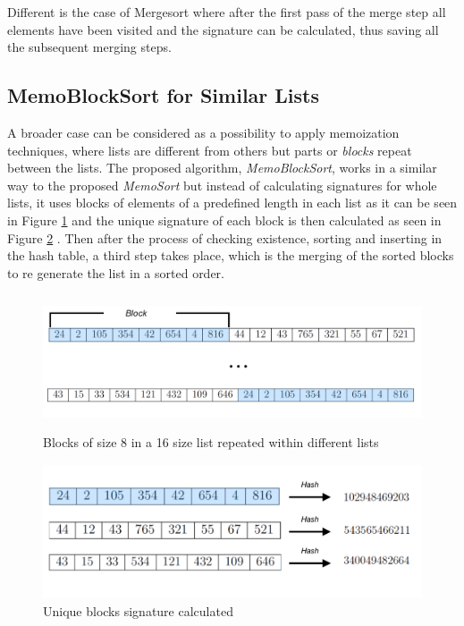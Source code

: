 \documentclass[a4paper,12pt]{article}
\begin{document}
Different is the case of Mergesort where after the first pass of the merge step all elements have been visited and the signature can be calculated, thus saving all the subsequent merging steps.

\subsection{MemoBlockSort for Similar Lists} \label{MemoBlockSort}
A broader case can be considered as a possibility to apply memoization techniques, where lists are different from others but parts or {\it blocks} repeat between the lists. The proposed algorithm, {\it MemoBlockSort}, works in a similar way to the proposed  {\it MemoSort} but instead of calculating signatures for whole lists, it uses blocks of elements of a predefined length in each list as it can be seen in Figure \ref{fig:MemoBlocSortDiagram} and the unique signature of each block is then calculated as seen in Figure \ref{fig:MemoBlocSortDiagramHash} . Then after the process of checking existence, sorting and inserting in the hash table, a third step takes place, which is the merging of the sorted blocks to re generate the list in a sorted order.\\

\begin{figure}[H]
    \centering
     \includegraphics[height=4cm,keepaspectratio]{./images/MemoBlockSort.png}
    \caption{Blocks of size 8 in a 16 size list repeated within different lists}
    \label{fig:MemoBlocSortDiagram}
\end{figure}

\begin{figure}[H]
    \centering
     \includegraphics[height=4cm,keepaspectratio]{./images/MemoBlockSortHash.png}
    \caption{Unique blocks signature calculated}
    \label{fig:MemoBlocSortDiagramHash}
\end{figure}
\end{document}
